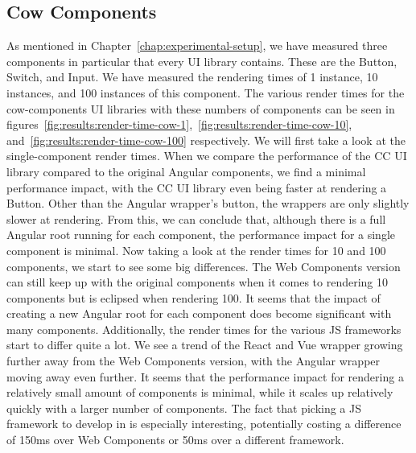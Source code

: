 \subsection{Cow Components}
As mentioned in Chapter~\ref{chap:experimental-setup}, we have measured three components in particular that every UI library contains. These are the Button, Switch, and Input. We have measured the rendering times of 1 instance, 10 instances, and 100 instances of this component. The various render times for the cow-components UI libraries with these numbers of components can be seen in figures~\ref{fig:results:render-time-cow-1},~\ref{fig:results:render-time-cow-10}, and~\ref{fig:results:render-time-cow-100} respectively. We will first take a look at the single-component render times. When we compare the performance of the CC UI library compared to the original Angular components, we find a minimal performance impact, with the CC UI library even being faster at rendering a Button. Other than the Angular wrapper's button, the wrappers are only slightly slower at rendering. From this, we can conclude that, although there is a full Angular root running for each component, the performance impact for a single component is minimal. Now taking a look at the render times for 10 and 100 components, we start to see some big differences. The Web Components version can still keep up with the original components when it comes to rendering 10 components but is eclipsed when rendering 100. It seems that the impact of creating a new Angular root for each component does become significant with many components.
Additionally, the render times for the various JS frameworks start to differ quite a lot. We see a trend of the React and Vue wrapper growing further away from the Web Components version, with the Angular wrapper moving away even further. It seems that the performance impact for rendering a relatively small amount of components is minimal, while it scales up relatively quickly with a larger number of components. The fact that picking a JS framework to develop in is especially interesting, potentially costing a difference of 150ms over Web Components or 50ms over a different framework.

